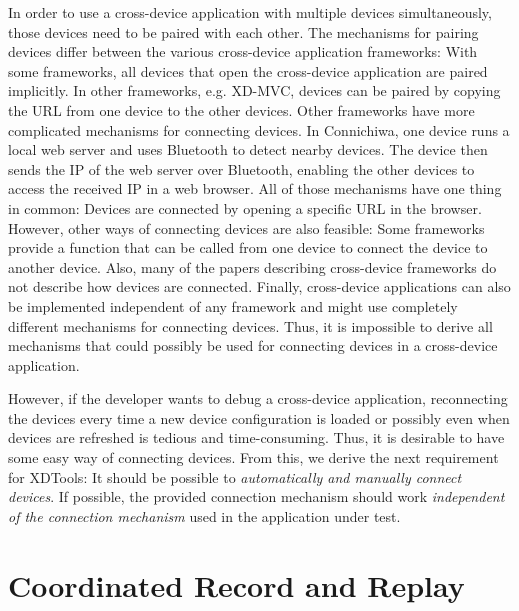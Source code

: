 In order to use a cross-device application with multiple devices simultaneously, those devices need to be paired with each other. The mechanisms for pairing devices differ between the various cross-device application frameworks: With some frameworks, all devices that open the cross-device application are paired implicitly. In other frameworks, e.g. XD-MVC, devices can be paired by copying the URL from one device to the other devices. Other frameworks have more complicated mechanisms for connecting devices. In Connichiwa, one device runs a local web server and uses Bluetooth to detect nearby devices. The device then sends the IP of the web server over Bluetooth, enabling the other devices to access the received IP in a web browser. All of those mechanisms have one thing in common: Devices are connected by opening a specific URL in the browser. However, other ways of connecting devices are also feasible: Some frameworks provide a function that can be called from one device to connect the device to another device. Also, many of the papers describing cross-device frameworks do not describe how devices are connected. Finally, cross-device applications can also be implemented independent of any framework and might use completely different mechanisms for connecting devices. Thus, it is impossible to derive all mechanisms that could possibly be used for connecting devices in a cross-device application.

However, if the developer wants to debug a cross-device application, reconnecting the devices every time a new device configuration is loaded or possibly even when devices are refreshed is tedious and time-consuming. Thus, it is desirable to have some easy way of connecting devices. From this, we derive the next requirement for XDTools: It should be possible to \emph{automatically and manually connect devices}. If possible, the provided connection mechanism should work \emph{independent of the connection mechanism} used in the application under test.

\section{Coordinated Record and Replay}

